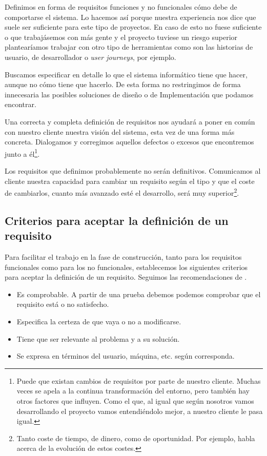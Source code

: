 Definimos en forma de requisitos funciones y no funcionales cómo debe de comportarse el
sistema. Lo hacemos así porque nuestra experiencia nos dice que suele ser suficiente
para este tipo de proyectos. En caso de esto no fuese suficiente o
que trabajásemos con más gente y el proyecto tuviese un riesgo superior plantearíamos
trabajar con otro tipo de herramientas como son las historias de usuario, de desarrollador
o \textit{user journeys}, por ejemplo.

Buscamos especificar en detalle lo que el sistema informático tiene que hacer, aunque no
cómo tiene que hacerlo. De esta forma no restringimos de forma innecesaria
las posibles soluciones de diseño o de Implementación que podamos encontrar.

Una correcta y completa definición de requisitos nos ayudará a poner en común con nuestro
cliente nuestra visión del sistema, esta vez de una forma más concreta. Dialogamos y corregimos
aquellos defectos o excesos que encontremos junto a él\footnote{%
    Puede que existan cambios de requisitos por parte de nuestro cliente. Muchas veces se
    apela a la continua transformación del entorno, pero también hay otros factores que influyen.
    Como el que, al igual que según nosotros vamos desarrollando el proyecto vamos entendiéndolo
    mejor, a nuestro cliente le pasa igual.
}.

Los requisitos que definimos probablemente no serán definitivos. Comunicamos al cliente nuestra
capacidad para cambiar un requisito según el tipo y que el coste de cambiarlos, cuanto más
avanzado esté el desarrollo, será muy superior\footnote{%
Tanto coste de tiempo, de dinero, como de oportunidad. Por ejemplo, \cite{CodeComplete2} habla
acerca de la evolución de estos costes.%
}.

\subsection{Criterios para aceptar la definición de un requisito}

Para facilitar el trabajo en la fase de construcción, tanto para los requisitos
funcionales como para los no funcionales, establecemos los siguientes criterios
para aceptar la definición de un requisito. Seguimos las recomendaciones de
\cite[Checklist: Requirements]{CodeComplete2}.

\begin{itemize}
    \item Es comprobable. A partir de una prueba debemos podemos comprobar
          que el requisito está o no satisfecho.
    \item Especifica la certeza de que vaya o no a modificarse.
    \item Tiene que ser relevante al problema y a su solución.
    \item Se expresa en términos del usuario, máquina, etc. según corresponda.
\end{itemize}


